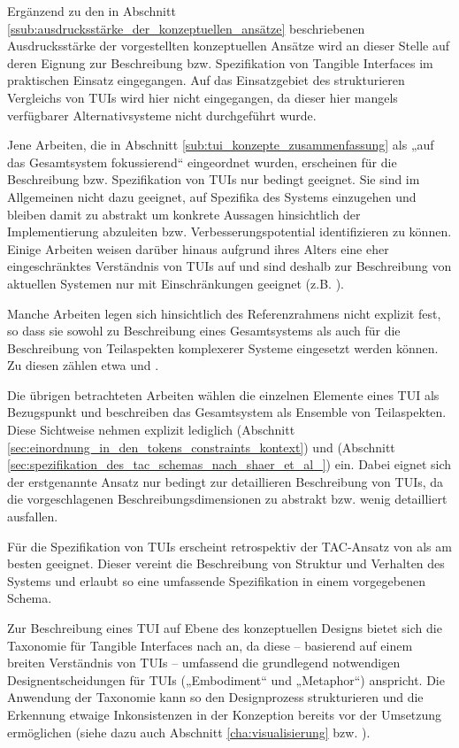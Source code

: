 Ergänzend zu den in Abschnitt \ref{ssub:ausdrucksstärke_der_konzeptuellen_ansätze} beschriebenen Ausdrucksstärke der vorgestellten konzeptuellen Ansätze wird an dieser Stelle auf deren Eignung zur Beschreibung bzw. Spezifikation von Tangible Interfaces im praktischen Einsatz eingegangen. Auf das Einsatzgebiet des strukturieren Vergleichs von \glspl{TUI} wird hier nicht eingegangen, da dieser hier mangels verfügbarer Alternativsysteme nicht durchgeführt wurde.

Jene Arbeiten, die in Abschnitt \ref{sub:tui_konzepte_zusammenfassung} als „auf das Gesamtsystem fokussierend“ eingeordnet wurden, erscheinen für die Beschreibung bzw. Spezifikation von \glspl{TUI} nur bedingt geeignet. Sie sind im Allgemeinen nicht dazu geeignet, auf Spezifika des Systems einzugehen und bleiben damit zu abstrakt um konkrete Aussagen hinsichtlich der Implementierung abzuleiten bzw. Verbesserungspotential identifizieren zu können. Einige Arbeiten weisen darüber hinaus aufgrund ihres Alters eine eher eingeschränktes Verständnis von \glspl{TUI} auf und sind deshalb zur Beschreibung von aktuellen Systemen nur mit Einschränkungen geeignet (z.B. \citep{Fitzmaurice96}).

Manche Arbeiten legen sich hinsichtlich des Referenzrahmens nicht explizit fest, so dass sie sowohl zu Beschreibung eines Gesamtsystems als auch für die Beschreibung von Teilaspekten komplexerer Systeme eingesetzt werden können. Zu diesen zählen etwa \citep{Koleva03} und \citet{Fishkin04}.

Die übrigen betrachteten Arbeiten wählen die einzelnen Elemente eines \gls{TUI} als Bezugspunkt und beschreiben das Gesamtsystem als Ensemble von Teilaspekten. Diese Sichtweise nehmen explizit lediglich \citep{Ullmer05} (Abschnitt \ref{sec:einordnung_in_den_tokens_constraints_kontext}) und \citep{Shaer04} (Abschnitt \ref{sec:spezifikation_des_tac_schemas_nach_shaer_et_al_}) ein. Dabei eignet sich der erstgenannte Ansatz nur bedingt zur detaillieren Beschreibung von \glspl{TUI}, da die vorgeschlagenen Beschreibungsdimensionen zu abstrakt bzw. wenig detailliert ausfallen.

Für die Spezifikation von \glspl{TUI} erscheint retrospektiv der TAC-Ansatz von \citet{Shaer04} als am besten geeignet. Dieser vereint die Beschreibung von Struktur und Verhalten des Systems und erlaubt so eine umfassende Spezifikation in einem vorgegebenen Schema. 

Zur Beschreibung eines \gls{TUI} auf Ebene des konzeptuellen Designs bietet sich die Taxonomie für Tangible Interfaces nach \citet{Fishkin04} an, da diese -- basierend auf einem breiten Verständnis von \glspl{TUI} -- umfassend die grundlegend notwendigen Designentscheidungen für \glspl{TUI} („Embodiment“ und „Metaphor“) anspricht. Die Anwendung der Taxonomie kann so den Designprozess strukturieren und die Erkennung etwaige Inkonsistenzen in der Konzeption bereits vor der Umsetzung ermöglichen (siehe dazu auch Abschnitt \ref{cha:visualisierung} bzw. \citep{Oppl09d}). 

